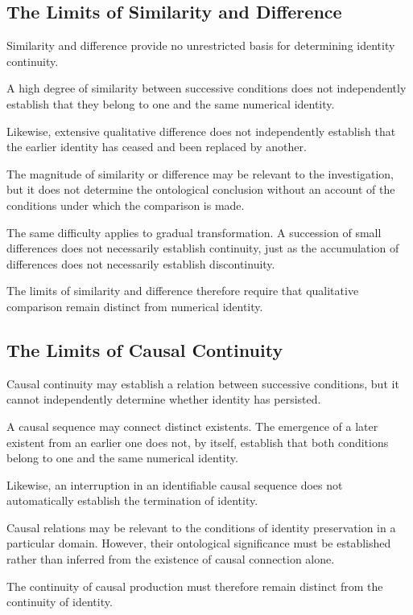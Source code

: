 \subsection{The Limits of Similarity and Difference}

Similarity and difference provide no unrestricted
basis for determining identity continuity.

A high degree of similarity between successive
conditions does not independently establish
that they belong to one and the same numerical
identity.

Likewise, extensive qualitative difference does
not independently establish that the earlier
identity has ceased and been replaced by another.

The magnitude of similarity or difference may
be relevant to the investigation, but it does
not determine the ontological conclusion without
an account of the conditions under which the
comparison is made.

The same difficulty applies to gradual transformation.
A succession of small differences does not
necessarily establish continuity, just as the
accumulation of differences does not necessarily
establish discontinuity.

The limits of similarity and difference therefore
require that qualitative comparison remain distinct
from numerical identity.

\subsection{The Limits of Causal Continuity}

Causal continuity may establish a relation between
successive conditions, but it cannot independently
determine whether identity has persisted.

A causal sequence may connect distinct existents.
The emergence of a later existent from an earlier
one does not, by itself, establish that both
conditions belong to one and the same numerical
identity.

Likewise, an interruption in an identifiable
causal sequence does not automatically establish
the termination of identity.

Causal relations may be relevant to the conditions
of identity preservation in a particular domain.
However, their ontological significance must be
established rather than inferred from the existence
of causal connection alone.

The continuity of causal production must therefore
remain distinct from the continuity of identity.

